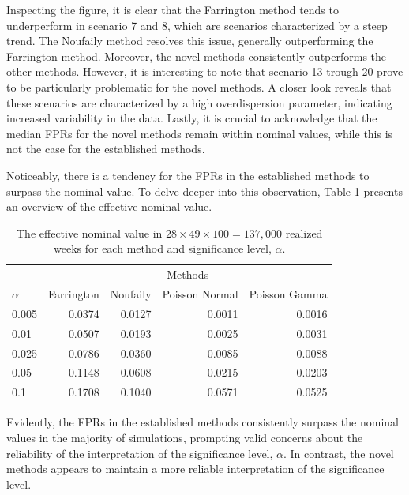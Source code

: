 \documentclass[preprint, 3p, authoryear]{elsarticle} %
\begin{document}
Inspecting the figure, it is clear that the Farrington method tends to underperform in scenario 7 and 8, which are scenarios characterized by a steep trend. The Noufaily method resolves this issue, generally outperforming the Farrington method. Moreover, the novel methods consistently outperforms the other methods. However, it is interesting to note that scenario 13 trough 20 prove to be particularly problematic for the novel methods. A closer look reveals that these scenarios are characterized by a high overdispersion parameter, indicating increased variability in the data. Lastly, it is crucial to acknowledge that the median FPRs for the novel methods remain within nominal values, while this is not the case for the established methods.

Noticeably, there is a tendency for the FPRs in the established methods to surpass the nominal value. To delve deeper into this observation, Table \ref{tab:nominalvalueTbl} presents an overview of the effective nominal value.

\begin{table}[H]

\caption{\label{tab:nominalvalueTbl}The effective nominal value in $28 \times 49 \times 100 = 137,000$ realized weeks for each method and significance level, $\alpha$.}
\centering
\begin{tabular}[t]{lrrrr}
\toprule
\multicolumn{1}{c}{ } & \multicolumn{4}{c}{Methods} \\
\cmidrule(l{3pt}r{3pt}){2-5}
$\alpha$ & Farrington & Noufaily & Poisson Normal & Poisson Gamma\\
\midrule
0.005 & 0.0374 & 0.0127 & 0.0011 & 0.0016\\
0.01 & 0.0507 & 0.0193 & 0.0025 & 0.0031\\
0.025 & 0.0786 & 0.0360 & 0.0085 & 0.0088\\
0.05 & 0.1148 & 0.0608 & 0.0215 & 0.0203\\
0.1 & 0.1708 & 0.1040 & 0.0571 & 0.0525\\
\bottomrule
\end{tabular}
\end{table}

Evidently, the FPRs in the established methods consistently surpass the nominal values in the majority of simulations, prompting valid concerns about the reliability of the interpretation of the significance level, \(\alpha\). In contrast, the novel methods appears to maintain a more reliable interpretation of the significance level.
\end{document}
